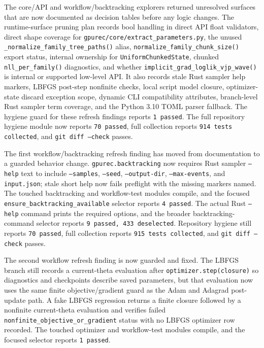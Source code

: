 \documentclass[11pt]{article}
\begin{document}
The core/API and workflow/backtracking explorers returned unresolved surfaces
that are now documented as decision tables before any logic changes.  The
runtime-surface pruning plan records bool handling in direct API float
validators, direct shape coverage for \texttt{gpurec/core/extract\_parameters.py},
the unused \texttt{\_normalize\_family\_tree\_paths()} alias,
\texttt{normalize\_family\_chunk\_size()} export status, internal ownership for
\texttt{UniformChunkedState}, chunked \texttt{nll\_per\_family()} diagnostics,
and whether \texttt{implicit\_grad\_loglik\_vjp\_wave()} is internal or supported
low-level API.  It also records stale Rust sampler help markers, LBFGS post-step
nonfinite checks, local script model closure, optimizer-state discard exception
scope, dynamic CLI compatibility attributes, branch-level Rust sampler term
coverage, and the Python 3.10 TOML parser fallback.  The hygiene guard for these
refresh findings reports \texttt{1 passed}.  The full repository hygiene module
now reports \texttt{70 passed}, full collection reports \texttt{914 tests
collected}, and \texttt{git diff --check} passes.

The first workflow/backtracking refresh finding has moved from documentation to a
guarded behavior change.  \texttt{gpurec.backtracking} now requires Rust sampler
\texttt{--help} text to include \texttt{--samples}, \texttt{--seed},
\texttt{--output-dir}, \texttt{--max-events}, and \texttt{input.json}; stale
short help now fails preflight with the missing markers named.  The touched
backtracking and workflow-test modules compile, and the focused
\texttt{ensure\_backtracking\_available} selector reports \texttt{4 passed}.
The actual Rust \texttt{--help} command prints the required options, and the
broader backtracking-command selector reports \texttt{9 passed, 433 deselected}.
Repository hygiene still reports \texttt{70 passed}, full collection reports
\texttt{915 tests collected}, and \texttt{git diff --check} passes.

The second workflow refresh finding is now guarded and fixed.  The LBFGS branch
still records a current-theta evaluation after \texttt{optimizer.step(closure)}
so diagnostics and checkpoints describe saved parameters, but that evaluation now
uses the same finite objective/gradient guard as the Adam and Adagrad post-update
path.  A fake LBFGS regression returns a finite closure followed by a nonfinite
current-theta evaluation and verifies failed
\texttt{nonfinite\_objective\_or\_gradient} status with no LBFGS optimizer row
recorded.  The touched optimizer and workflow-test modules compile, and the
focused selector reports \texttt{1 passed}.
\end{document}
